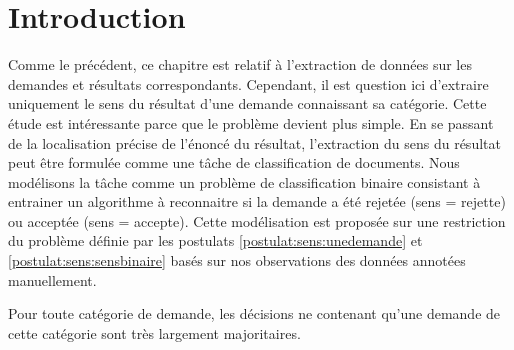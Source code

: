\section{Introduction}
\label{sec:sensresultat:motivation}


Comme le précédent, ce chapitre est relatif à l'extraction de données sur les demandes et résultats correspondants. Cependant, il est question ici d'extraire uniquement le sens du résultat d'une demande connaissant sa catégorie. Cette étude est intéressante parce que le problème devient plus simple. En se passant de la localisation précise de l'énoncé du résultat, l'extraction du sens du résultat peut être formulée comme une tâche de classification de documents. Nous modélisons la tâche comme un problème de classification binaire consistant à entrainer un algorithme à reconnaitre si la demande a été rejetée (sens = rejette) ou acceptée (sens = accepte). Cette modélisation est proposée sur une restriction du problème définie par les postulats %
 \ref{postulat:sens:unedemande} et \ref{postulat:sens:sensbinaire} basés sur nos observations des données annotées manuellement.
\begin{postulat}\label{postulat:sens:unedemande}
Pour toute catégorie de demande, les décisions ne contenant qu'une demande de cette catégorie sont très largement majoritaires. 
\end{postulat} 

